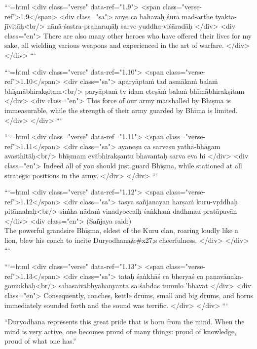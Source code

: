 ```{=html}
<div class="verse" data-ref="1.9">
  <span class="verse-ref">1.9</span>
  <div class="sa">
    anye ca bahavaḥ śūrā mad-arthe tyakta-jīvitāḥ<br/>
    nānā-śastra-praharaṇāḥ sarve yuddha-viśāradāḥ
  </div>
  <div class="en">
    There are also many other heroes who have offered their lives for my sake, all wielding various weapons and experienced in the art of warfare.
  </div>
</div>
```



```{=html}
<div class="verse" data-ref="1.10">
  <span class="verse-ref">1.10</span>
  <div class="sa">
    aparyāptaṁ tad asmākaṁ balaṁ bhīṣmābhirakṣitam<br/>
    paryāptaṁ tv idam eteṣāṁ balaṁ bhīmābhirakṣitam
  </div>
  <div class="en">
    This force of our army marshalled by Bhīṣma is immeasurable, while the strength of their army guarded by Bhīma is limited.
  </div>
</div>
```



```{=html}
<div class="verse" data-ref="1.11">
  <span class="verse-ref">1.11</span>
  <div class="sa">
    ayaneṣu ca sarveṣu yathā-bhāgam avasthitāḥ<br/>
    bhīṣmam evābhirakṣantu bhavantaḥ sarva eva hi
  </div>
  <div class="en">
    Indeed all of you should just guard Bhīṣma, while stationed at all strategic positions in the army.
  </div>
</div>
```



```{=html}
<div class="verse" data-ref="1.12">
  <span class="verse-ref">1.12</span>
  <div class="sa">
    tasya sañjanayan harṣaṁ kuru-vṛddhaḥ pitāmahaḥ<br/>
    siṁha-nādaṁ vinadyoccaiḥ śaṅkhaṁ dadhmau pratāpavān
  </div>
  <div class="en">
    \hspace*{1em}(Sañjaya said:) \\ The powerful grandsire Bhīṣma, eldest of the Kuru clan, roaring loudly like a lion, blew his conch to incite Duryodhana&#x27;s cheerfulness.
  </div>
</div>
```



```{=html}
<div class="verse" data-ref="1.13">
  <span class="verse-ref">1.13</span>
  <div class="sa">
    tataḥ śaṅkhāś ca bheryaś ca paṇavānaka-gomukhāḥ<br/>
    sahasaivābhyahanyanta sa śabdas tumulo ’bhavat
  </div>
  <div class="en">
    Consequently, conches, kettle drums, small and big drums, and horns immediately sounded forth and the sound was terrific.
  </div>
</div>
```



\enquote{Duryodhana represents this great pride that is born from the mind. When the mind is very active, one becomes proud of many things: proud of knowledge, proud of what one has.}

